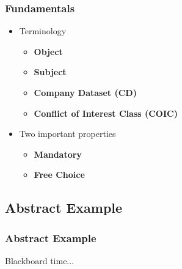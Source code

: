 \documentclass[10pt]{beamer}
\begin{document}
\begin{frame}
	\frametitle{Fundamentals}
	
	\begin{itemize}
		\item Terminology
		\begin{itemize}
			\item \textbf{Object}
			\item \textbf{Subject}
			\item \textbf{Company Dataset (CD)}
			\item \textbf{Conflict of Interest Class (COIC)}
		\end{itemize}
		\item Two important properties
			\begin{itemize}
				\item \textbf{Mandatory}
				\item \textbf{Free Choice}
			\end{itemize}
	\end{itemize}
\end{frame}

\subsection{Abstract Example}
\begin{frame}
	\frametitle{Abstract Example}
	
	Blackboard time...
\end{frame}
\end{document}
